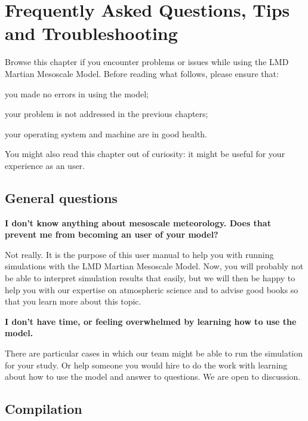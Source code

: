 \chapter{Frequently Asked Questions, Tips and Troubleshooting}\label{faq}

\vk
Browse this chapter if you encounter problems or issues while using the LMD Martian Mesoscale Model. Before reading what follows, please ensure that:
\begin{citemize}
\item you made no errors in using the model;
\item your problem is not addressed in the previous chapters;
\item your operating system and machine are in good health.
\end{citemize}
You might also read this chapter out of curiosity: it might be useful for your experience as an user.

\mk
\section{General questions}

\sk
\noindent \textbf{I don't know anything about mesoscale meteorology. Does that prevent me from becoming an user of your model?}
\begin{finger}
\item Not really. It is the purpose of this user manual to help you with running simulations with the LMD Martian Mesoscale Model. Now, you will probably not be able to interpret simulation results that easily, but we will then be happy to help you with our expertise on atmospheric science and to advise good books so that you learn more about this topic.
\end{finger}

\sk
\noindent \textbf{I don't have time, or feeling overwhelmed by learning how to use the model.}
\begin{finger}
\item There are particular cases in which our team might be able to run the simulation for your study. Or help someone you would hire to do the work with learning about how to use the model and answer to questions. We are open to discussion.
\end{finger}

\mk
\section{Compilation}

